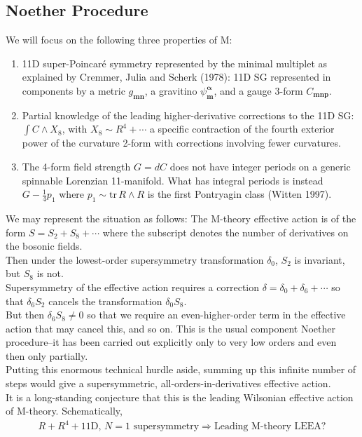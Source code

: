 \documentclass[a4paper,12pt]{article} %
\begin{document}
\subsection{Noether Procedure}
We will focus on the following three properties of M:
\begin{enumerate}
\item 11D super-Poincar\'e symmetry represented by the minimal multiplet as explained by Cremmer, Julia and Scherk (1978): 11D SG represented in components by a metric $g_{\bm {mn}}$, a gravitino $\psi_{\bm m}^{\bm \alpha}$, and a gauge 3-form $C_{\bm {mnp}}$. 
\item Partial knowledge of the leading higher-derivative corrections to the 11D SG: $\int C \wedge X_8$, with $X_8 \sim R^4+\cdots$ a specific contraction of the fourth exterior power of the curvature 2-form with corrections involving fewer curvatures.
\item The 4-form field strength $G=dC$ does not have integer periods on a generic spinnable Lorenzian 11-manifold. What has integral periods is instead $G - \tfrac14 p_1$ where $p_1 \sim \mathrm{tr} \, R\wedge R$ is the first Pontryagin class (Witten 1997).
\end{enumerate}
We may represent the situation as follows: The M-theory effective action is of the form $S=S_2 + S_8 +\cdots$ where the subscript denotes the number of derivatives on the bosonic fields. \\
Then under the lowest-order supersymmetry transformation $\delta_0$, $S_2$ is invariant, but $S_8$ is not. \\
Supersymmetry of the effective action requires a correction $\delta= \delta_0+\delta_6 +\cdots$ so that $\delta_6 S_2$ cancels the transformation $\delta_0 S_8$. \\
But then $\delta_6 S_8\neq 0$ so that we require an even-higher-order term in the effective action that may cancel this, and so on.
This is the usual component Noether procedure--it has been carried out explicitly only to very low orders and even then only partially.\\
Putting this enormous technical hurdle aside, summing up this infinite number of steps would give a supersymmetric, all-orders-in-derivatives effective action. \\
It is a long-standing conjecture that this is the leading Wilsonian effective action of M-theory. Schematically,
\begin{align}
\label{E:MLEEA}
R + R^4 + \textrm{11D, $N=1$ supersymmetry} \Rightarrow \textrm{Leading M-theory LEEA?}
\tag{$\ast$}
\end{align}
\end{document}
